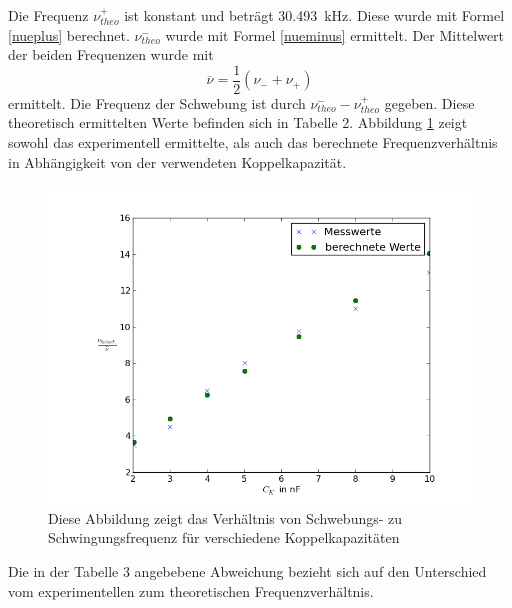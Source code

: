 \documentclass[11pt,ngerman,a4paper]{article}
\begin{document}
\noindent
Die Frequenz $\nu_{theo}^+$ ist konstant und beträgt \SI{30,493}{\kHz}. Diese wurde mit Formel \ref{nueplus} berechnet.  $\nu_{theo}^-$ wurde mit Formel \ref{nueminus} ermittelt. Der Mittelwert der beiden Frequenzen wurde mit 
\[
\overline{\nu}=\frac{1}{2}(\nu_-+\nu_+)
\]
ermittelt. Die Frequenz der Schwebung ist durch $\nu_{theo}^--\nu_{theo}^+$ gegeben. Diese theoretisch ermittelten Werte befinden sich in Tabelle 2. Abbildung \ref{41} zeigt sowohl das experimentell ermittelte, als auch das berechnete Frequenzverhältnis in Abhängigkeit von der verwendeten Koppelkapazität.
\begin{figure}[h]
\centering
\includegraphics[scale=0.6]{Abb/diag1.png}
\caption{Diese Abbildung zeigt das Verhältnis von Schwebungs- zu Schwingungsfrequenz für verschiedene Koppelkapazitäten}
\label{41}
\end{figure}

\noindent
Die in der Tabelle 3 angebebene Abweichung bezieht sich auf den Unterschied vom experimentellen zum theoretischen Frequenzverhältnis.
\end{document}
